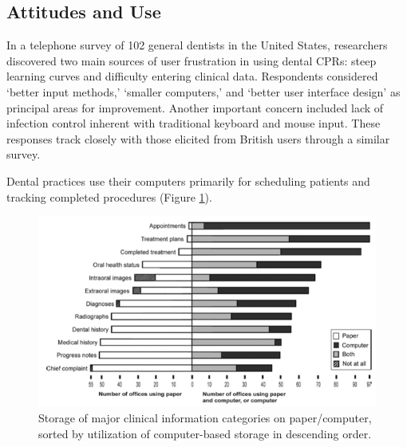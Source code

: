 \documentclass[11pt]{article}
\begin{document}
\subsection{Attitudes and Use}
In a telephone survey of 102 general dentists in the United States, researchers discovered two main sources of user frustration in using dental CPRs: steep learning curves and difficulty entering clinical data\cite{Schleyer2006Clinical-Comput}. Respondents considered `better input methods,' `smaller computers,' and `better user interface design' as principal areas for improvement. Another important concern included lack of infection control inherent with traditional keyboard and mouse input. These responses track closely with those elicited from British users through a similar survey\cite{John2003Questionnaire-s}.

Dental practices use their computers primarily for scheduling patients and tracking completed procedures (Figure \ref{use}).\label{fig:4}
\begin{figure}[h!]
\begin{center}
\includegraphics[width=\textwidth]{papervscomp.jpg}
\end{center}
\caption{Storage of major clinical information categories on paper/computer, sorted by utilization of computer-based storage in descending order\cite{Schleyer2007A-Qualitative-I}.}
\label{use}
\end{figure}
\end{document}
